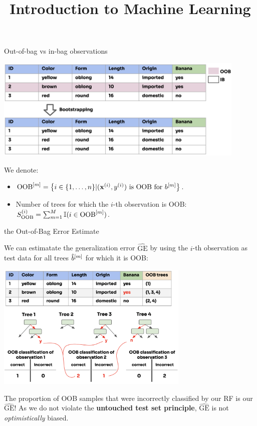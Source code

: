 \documentclass[11pt,compress,t,notes=noshow,xcolor=table]{beamer}
\title{Introduction to Machine Learning}
\institute{\href{https://compstat-lmu.github.io/lecture_i2ml/}{compstat-lmu.github.io/lecture\_i2ml}}
\date{}
\begin{document}
\sloppy


\begin{vbframe}{Out-of-bag vs in-bag observations}
  
\begin{center}
\includegraphics[width=0.9\textwidth]{figure_man/forest-oob.png}
\end{center}

We denote:
\begin{itemize}
  \item $\text{OOB}^{[m]} = \left \{i \in \{1, \ldots, n\} | (\mathbf{x}^{(i)}, y^{(i)}) \text{ is OOB for } b^{[m]} \right \}$.
  \item Number of trees for which the $i$-th observation is OOB: $S_{\text{OOB}}^{(i)} = \sum_{m = 1}^M \mathbb{I}(i \in \text{OOB}^{[m]})$.
\end{itemize}

\end{vbframe}

\begin{vbframe}{the Out-of-Bag Error Estimate}

We can estimatate the generalization error $\widehat{\mathrm{GE}}$ by using the $i$-th observation as test data for all trees $\hat{b}^{[m]}$ for which it is OOB:

\begin{center}
\includegraphics[width=0.69\textwidth]{figure_man/forest-oob-error.png}
\end{center}

\footnotesize{The proportion of OOB samples that were incorrectly classified by our RF is our $\widehat{\mathrm{GE}}$! As we do not violate the \textbf{untouched test set principle}, $\widehat{\mathrm{GE}}$ is not \textit{optimistically} biased.}
\end{vbframe}
\end{document}
